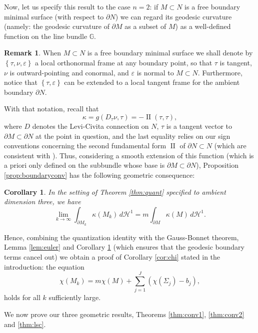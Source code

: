 \documentclass[10pt]{amsart}
\newcounter{cas}
\DeclareMathOperator{\II}{II}
\newtheorem{cor}[thm]{Corollary}
\theoremstyle{definition}
\newtheorem{rmk}[thm]{Remark}
\newcommand{\h}{\mathscr{H}}
\let\eps\varepsilon
\let\epsilon\eps
\begin{document}
Now, let us specify this result to the case $n=2$: if $M\subset N$ is a free boundary minimal surface (with respect to $\partial N$) we can regard its geodesic curvature (namely: the geodesic curvature of $\partial M$ as a subset of $M$) as a well-defined function on the line bundle $\mathbb{G}$.

\begin{rmk}\label{rem:frame}
When $M\subset N$ is a free boundary minimal surface we shall denote by $\left\{\tau,\nu,\epsilon \right\}$ a local orthonormal frame at any boundary point, so that $\tau$ is tangent, $\nu$ is outward-pointing and conormal, and $\epsilon$ is normal to $M\subset N$. Furthermore, notice that $\left\{\tau,\epsilon\right\}$ can be extended to a local tangent frame for the ambient boundary $\partial N$.
\end{rmk}
\noindent With that notation, recall that
\[
\kappa=g(D_{\tau}\nu,\tau)=-\II(\tau,\tau),
\]
where $D$ denotes the Levi-Civita connection on $N$, $\tau$ is a tangent vector to $\partial M\subset\partial N$ at the point in question, and the last equality relies on our sign conventions concerning the second fundamental form $\II$ of $\partial N\subset N$ (which are consistent with \cite{ACS17}). Thus, considering a smooth extension of this function (which is a priori only defined on the subbundle whose base is $\partial M\subset\partial N$), Proposition \ref{prop:boundaryconv} has the following geometric consequence:

\begin{cor}\label{cor:geodcurv}
In the setting of Theorem \ref{thm:quant} specified to ambient dimension three, we have
\[
\lim_{k\to\infty}\int_{\partial M_k} \kappa(M_k)\,d\h^1 = m\int_{\partial M} \kappa(M)\,d\h^1.
\]
\end{cor}

Hence, combining the quantization identity with the Gauss-Bonnet theorem, Lemma \ref{lem:euler} and Corollary \ref{cor:geodcurv} (which ensures that the geodesic boundary terms cancel out) we obtain a proof of Corollary \ref{cor:chi} stated in the introduction: the equation
\begin{equation*}
\chi(M_k)= m\chi(M)+ \sum_{j=1}^J (\chi(\Sigma_j)-b_j),
\end{equation*}
holds for all $k$ sufficiently large.

We now prove our three geometric results, Theorems \ref{thm:conv1}, \ref{thm:conv2} and \ref{thm:lsc}.
\end{document}
